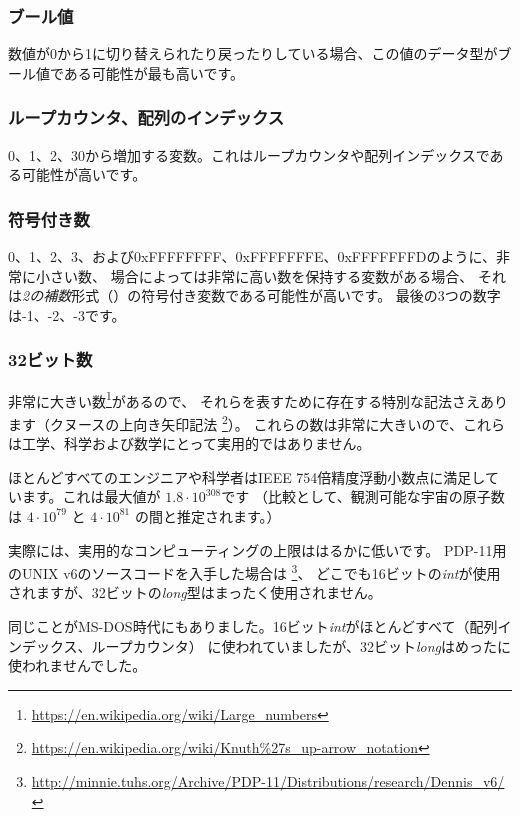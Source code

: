 \subsubsection{ブール値}

数値が0から1に切り替えられたり戻ったりしている場合、この値のデータ型がブール値である可能性が最も高いです。

\subsubsection{ループカウンタ、配列のインデックス}

0、1、2、30から増加する変数。これはループカウンタや配列インデックスである可能性が高いです。

\subsubsection{符号付き数}

0、1、2、3、および0xFFFFFFFF、0xFFFFFFFE、0xFFFFFFFDのように、非常に小さい数、
場合によっては非常に高い数を保持する変数がある場合、
それは\emph{2の補数}形式（）の符号付き変数である可能性が高いです。
最後の3つの数字は-1、-2、-3です。

\subsubsection{32ビット数}

非常に大きい数\footnote{\url{https://en.wikipedia.org/wiki/Large_numbers}}があるので、
それらを表すために存在する特別な記法さえあります（クヌースの上向き矢印記法
\footnote{\url{https://en.wikipedia.org/wiki/Knuth\%27s_up-arrow_notation}}）。
これらの数は非常に大きいので、これらは工学、科学および数学にとって実用的ではありません。

ほとんどすべてのエンジニアや科学者はIEEE 754倍精度浮動小数点に満足しています。これは最大値が
$1.8 \cdot 10^{308}$です
（比較として、観測可能な宇宙の原子数は
$4 \cdot 10^{79}$ と $4 \cdot 10^{81}$ の間と推定されます。）

実際には、実用的なコンピューティングの上限ははるかに低いです。 
PDP-11用のUNIX v6のソースコードを入手した場合は
\footnote{\url{http://minnie.tuhs.org/Archive/PDP-11/Distributions/research/Dennis_v6/}}、
どこでも16ビットの\emph{int}が使用されますが、32ビットの\emph{long}型はまったく使用されません。

同じことがMS-DOS時代にもありました。16ビット\emph{int}がほとんどすべて（配列インデックス、ループカウンタ）
に使われていましたが、32ビット\emph{long}はめったに使われませんでした。

